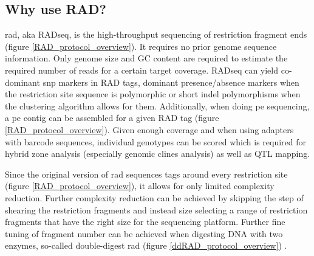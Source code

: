 \documentclass[a4paper,12pt,times,print,index, custombib]{PhDThesisPSnPDF}\usepackage[]{graphicx}\usepackage[]{color}
\begin{document}
\subsection{Why use RAD?}
\gls{rad}, aka RADseq, is the high-throughput sequencing of restriction fragment ends (figure \ref{RAD_protocol_overview}). It requires no prior genome sequence information. Only genome size and GC content are required to estimate the required number of \glspl{read} for a certain target coverage. 
RADseq can yield co-dominant \gls{snp} markers in \glspl{RAD tag}, dominant presence/absence markers when the restriction site sequence is polymorphic or short indel polymorphisms when the clustering algorithm allows for them. Additionally, when doing \gls{pe} sequencing, a \gls{pe} contig can be assembled for a given \gls{RAD tag} (figure \ref{RAD_protocol_overview}).
Given enough coverage and when using adapters with barcode sequences, individual genotypes can be scored which is required for hybrid zone analysis (especially genomic clines analysis) as well as QTL mapping. 

Since the original version of \gls{rad} sequences tags around every restriction site (figure \ref{RAD_protocol_overview}), it allows for only limited complexity reduction. Further complexity reduction can be achieved by skipping the step of shearing the restriction fragments and instead size selecting a range of restriction fragments that have the right size for the sequencing platform. Further fine tuning of fragment number can be achieved when digesting DNA with two enzymes, so-called double-digest \gls{rad} (figure \ref{ddRAD_protocol_overview}) \citep{Peterson2012}.
\end{document}
